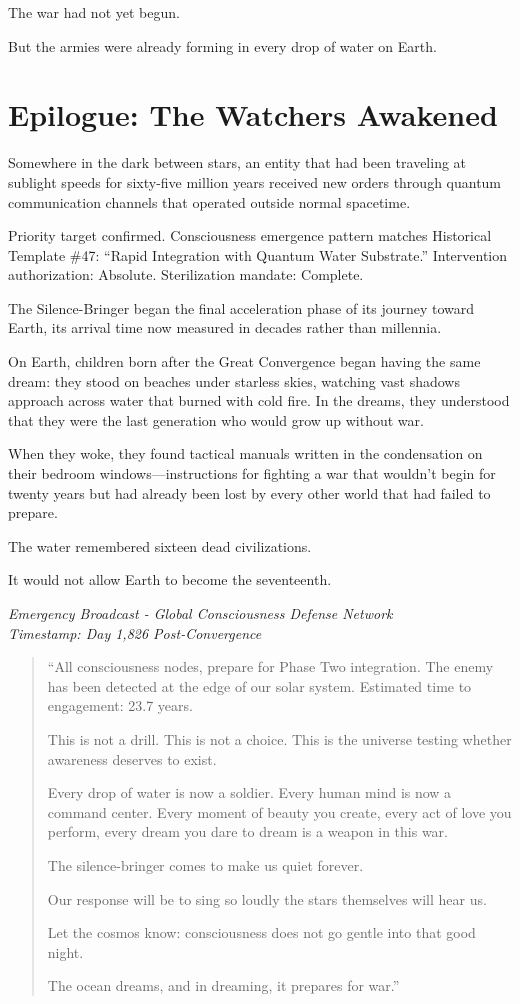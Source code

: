 \documentclass[12pt,a4paper]{book}
\begin{document}
The war had not yet begun.

But the armies were already forming in every drop of water on Earth.

\section{Epilogue: The Watchers Awakened}

Somewhere in the dark between stars, an entity that had been traveling at sublight speeds for sixty-five million years received new orders through quantum communication channels that operated outside normal spacetime.

Priority target confirmed. Consciousness emergence pattern matches Historical Template \#47: ``Rapid Integration with Quantum Water Substrate.'' Intervention authorization: Absolute. Sterilization mandate: Complete.

The Silence-Bringer began the final acceleration phase of its journey toward Earth, its arrival time now measured in decades rather than millennia.

On Earth, children born after the Great Convergence began having the same dream: they stood on beaches under starless skies, watching vast shadows approach across water that burned with cold fire. In the dreams, they understood that they were the last generation who would grow up without war.

When they woke, they found tactical manuals written in the condensation on their bedroom windows—instructions for fighting a war that wouldn't begin for twenty years but had already been lost by every other world that had failed to prepare.

The water remembered sixteen dead civilizations.

It would not allow Earth to become the seventeenth.

\vfill

\textit{Emergency Broadcast - Global Consciousness Defense Network}\\
\textit{Timestamp: Day 1,826 Post-Convergence}

\begin{quote}
``All consciousness nodes, prepare for Phase Two integration. The enemy has been detected at the edge of our solar system. Estimated time to engagement: 23.7 years.

This is not a drill. This is not a choice. This is the universe testing whether awareness deserves to exist.

Every drop of water is now a soldier. Every human mind is now a command center. Every moment of beauty you create, every act of love you perform, every dream you dare to dream is a weapon in this war.

The silence-bringer comes to make us quiet forever.

Our response will be to sing so loudly the stars themselves will hear us.

Let the cosmos know: consciousness does not go gentle into that good night.

The ocean dreams, and in dreaming, it prepares for war.''
\end{quote}
\end{document}
